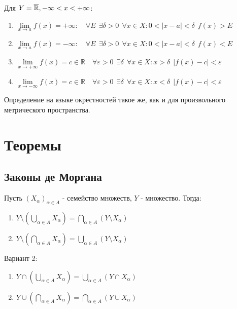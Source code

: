 Для $Y=\overline{\operatorname*{\mathbb{R}}}, -\infty<x<+\infty$:

\begin{enumerate}
    \item $\lim\limits_{x\to a}f(x)=+\infty: \quad \forall E \ \ \exists \delta>0 \ \ \forall x\in X : 0<|x-a|<\delta \ \ f(x)>E$
    \item $\lim\limits_{x\to a}f(x)=-\infty: \quad \forall E \ \ \exists \delta>0 \ \ \forall x\in X : 0<|x-a|<\delta \ \ f(x)<E$
    \item $\lim\limits_{x\to +\infty}f(x)=c\in\mathbb{R} \quad \forall \varepsilon>0 \ \ \exists \delta \ \ \forall x\in X : x>\delta \ \ |f(x)-c|<\varepsilon$
    \item $\lim\limits_{x\to -\infty}f(x)=c\in\mathbb{R} \quad \forall \varepsilon>0 \ \ \exists \delta \ \ \forall x\in X : x<\delta \ \ |f(x)-c|<\varepsilon$
\end{enumerate}

Определение на языке окрестностей такое же, как и для произвольного метрического пространства.

\section{Теоремы}

\subsection{Законы де Моргана}

Пусть $(X_\alpha)_{\alpha \in A}$ - семейство множеств, $Y$ - множество. Тогда:

\begin{enumerate}
    \item $Y\setminus(\bigcup\limits_{\alpha \in A}X_\alpha) = \bigcap\limits_{\alpha \in A}(Y\setminus X_\alpha)$
    \item $Y\setminus(\bigcap\limits_{\alpha \in A}X_\alpha) = \bigcup\limits_{\alpha \in A}(Y\setminus X_\alpha)$
\end{enumerate}

Вариант 2:

\begin{enumerate}
    \item $Y\cap(\bigcup\limits_{\alpha \in A}X_\alpha) = \bigcup\limits_{\alpha \in A}(Y\cap X_\alpha)$
    \item $Y\cup(\bigcap\limits_{\alpha \in A}X_\alpha) = \bigcap\limits_{\alpha \in A}(Y\cup X_\alpha)$
\end{enumerate}

